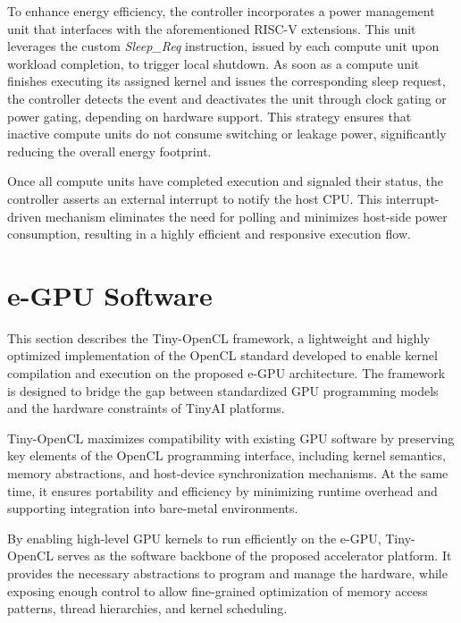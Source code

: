             To enhance energy efficiency, the controller incorporates a power management unit that interfaces with the aforementioned RISC-V extensions. This unit leverages the custom \emph{Sleep\_Req} instruction, issued by each compute unit upon workload completion, to trigger local shutdown. As soon as a compute unit finishes executing its assigned kernel and issues the corresponding sleep request, the controller detects the event and deactivates the unit through clock gating or power gating, depending on hardware support. This strategy ensures that inactive compute units do not consume switching or leakage power, significantly reducing the overall energy footprint.
            
            Once all compute units have completed execution and signaled their status, the controller asserts an external interrupt to notify the host CPU. This interrupt-driven mechanism eliminates the need for polling and minimizes host-side power consumption, resulting in a highly efficient and responsive execution flow.

    \section{e-GPU Software}
    \label{sec:e-gpu_software} 
        
        This section describes the \mbox{Tiny-OpenCL} framework, a lightweight and highly optimized implementation of the OpenCL standard developed to enable kernel compilation and execution on the proposed \mbox{e-GPU} architecture. The framework is designed to bridge the gap between standardized GPU programming models and the hardware constraints of TinyAI platforms.
    
        \mbox{Tiny-OpenCL} maximizes compatibility with existing GPU software by preserving key elements of the OpenCL programming interface, including kernel semantics, memory abstractions, and host-device synchronization mechanisms. At the same time, it ensures portability and efficiency by minimizing runtime overhead and supporting integration into bare-metal environments.
    
        By enabling high-level GPU kernels to run efficiently on the \mbox{e-GPU}, \mbox{Tiny-OpenCL} serves as the software backbone of the proposed accelerator platform. It provides the necessary abstractions to program and manage the hardware, while exposing enough control to allow fine-grained optimization of memory access patterns, thread hierarchies, and kernel scheduling.
    
